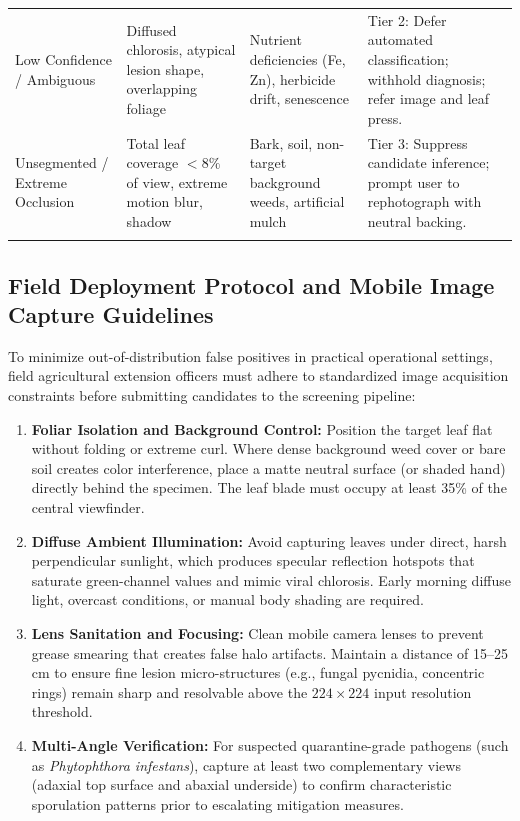 \documentclass[pdflatex,sn-mathphys-num]{sn-jnl}
\theoremstyle{thmstyleone}%
\theoremstyle{thmstyletwo}%
\theoremstyle{thmstylethree}%
\begin{document}
\begin{appendices}
\begin{table}[h]
\begin{tabular*}{\textwidth}{@{\extracolsep\fill}p{2.3cm}p{3.2cm}p{2.5cm}p{3.6cm}}
Low Confidence / Ambiguous & \raggedright Diffused chlorosis, atypical lesion shape, overlapping foliage & \raggedright Nutrient deficiencies (Fe, Zn), herbicide drift, senescence & \raggedright Tier 2: Defer automated classification; withhold diagnosis; refer image and leaf press. \\
Unsegmented / Extreme Occlusion & \raggedright Total leaf coverage $< 8\%$ of view, extreme motion blur, shadow & \raggedright Bark, soil, non-target background weeds, artificial mulch & \raggedright Tier 3: Suppress candidate inference; prompt user to rephotograph with neutral backing. \\
\botrule
\end{tabular*}
\end{table}

\subsection{Field Deployment Protocol and Mobile Image Capture Guidelines}
To minimize out-of-distribution false positives in practical operational settings, field agricultural extension officers must adhere to standardized image acquisition constraints before submitting candidates to the screening pipeline:
\begin{enumerate}
  \item \textbf{Foliar Isolation and Background Control:} Position the target leaf flat without folding or extreme curl. Where dense background weed cover or bare soil creates color interference, place a matte neutral surface (or shaded hand) directly behind the specimen. The leaf blade must occupy at least 35\% of the central viewfinder.
  \item \textbf{Diffuse Ambient Illumination:} Avoid capturing leaves under direct, harsh perpendicular sunlight, which produces specular reflection hotspots that saturate green-channel values and mimic viral chlorosis. Early morning diffuse light, overcast conditions, or manual body shading are required.
  \item \textbf{Lens Sanitation and Focusing:} Clean mobile camera lenses to prevent grease smearing that creates false halo artifacts. Maintain a distance of 15--25\,cm to ensure fine lesion micro-structures (e.g., fungal pycnidia, concentric rings) remain sharp and resolvable above the $224 \times 224$ input resolution threshold.
  \item \textbf{Multi-Angle Verification:} For suspected quarantine-grade pathogens (such as \textit{Phytophthora infestans}), capture at least two complementary views (adaxial top surface and abaxial underside) to confirm characteristic sporulation patterns prior to escalating mitigation measures.
\end{enumerate}

\end{appendices}



\end{document}
